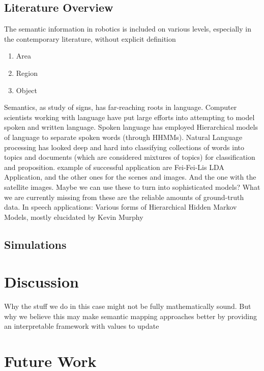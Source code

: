 \documentclass[twocolumn,letterpaper]{IEEEAerospaceCLS}  %
\begin{document}
\subsection{Literature Overview}
The semantic information in robotics is included on various levels, especially in the contemporary literature, without explicit definition
\begin{enumerate}
    \item Area
    \item Region
    \item Object
\end{enumerate}
Semantics, as study of signs, has far-reaching roots in language. Computer scientists working with language have put large efforts into attempting to model spoken and written language. Spoken language has employed Hierarchical models of language to separate spoken words (through HHMMs). Natural Language processing has looked deep and hard into classifying collections of words into topics and documents (which are considered mixtures of topics) for classification and proposition. 
example of successful application are Fei-Fei-Lis LDA Application, and the other ones for the scenes and images. And the one with the satellite images. Maybe we can use these to turn into sophisticated models?
What we are currently missing from these are the reliable amounts of ground-truth data.
In speech applications: Various forms of Hierarchical Hidden Markov Models, mostly elucidated by Kevin Murphy~\cite{murphy_dynamic_2002}
\subsection{Simulations}

\section{Discussion} \label{sec:Disc}
Why the stuff we do in this case might not be fully mathematically sound. But why we believe this may make semantic mapping approaches better by providing an interpretable framework with values to update 
\section{Future Work} \label{sec:Fut}
\appendices{}              %
\end{document}
